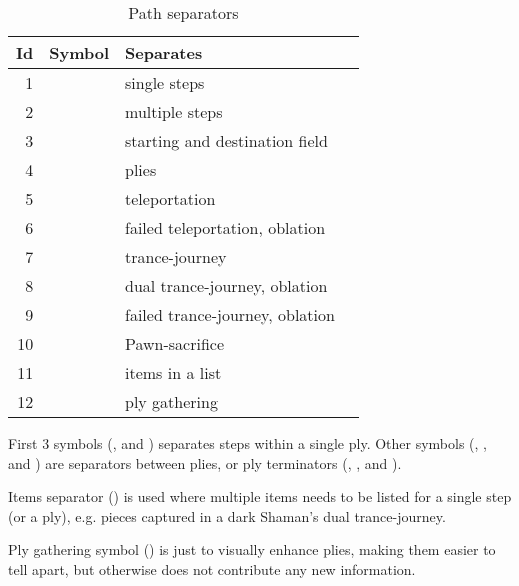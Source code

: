 \begin{table}[!h]
\centering
\begin{tabular}{ rlll }
\toprule
\textbf{Id} & \textbf{Symbol}      & \textbf{Separates}                         \\
\midrule
 1          & \alg{.}              & single steps                               \\
 2          & \alg{..}             & multiple steps                             \\
 3          & \alg{-}              & starting and destination field             \\ \cmidrule{1-3}
 4          & \alg{\~{}}           & plies                                      \\
 5          & \alg{|}              & teleportation                              \\
 6          & \alg{||}             & failed teleportation, oblation             \\
 7          & \alg{@}              & trance-journey                             \\
 8          & \alg{@@}             & dual trance-journey, oblation              \\
 9          & \alg{@@@}            & failed trance-journey, oblation            \\
10          & \alg{::}             & Pawn-sacrifice                             \\ \cmidrule{1-3}
11          & \alg{,}              & items in a list                            \\
12          & \alg{[]}             & ply gathering                              \\
\bottomrule
\end{tabular}
\caption{Path separators}
\label{tbl:Appendix/Summary/Path separators}
\end{table}

First 3 symbols (,  and \alg{-}) separates steps within a single ply.
Other symbols (\alg{\~{}}, \alg{|},  and \alg{::}) are separators between plies,
or ply terminators (\alg{||}, , and ).

Items separator (\alg{,}) is used where multiple items needs to be listed for a single
step (or a ply), e.g. pieces captured in a dark Shaman's dual trance-journey.

Ply gathering symbol (\alg{[]}) is just to visually enhance plies, making them easier
to tell apart, but otherwise does not contribute any new information.

